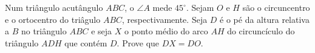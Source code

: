 Num triângulo acutângulo $ABC$, o $\angle A$ mede $45^\circ$. Sejam $O$ e $H$ são o circuncentro e o ortocentro do triâgulo $ABC$, respectivamente. Seja $D$ é o pé da altura relativa a $B$ no triângulo $ABC$ e seja $X$ o ponto médio do arco $AH$ do circuncículo do triângulo $ADH$ que contém $D$. Prove que $DX = DO$.
